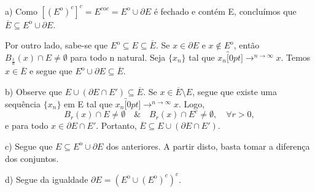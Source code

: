 \documentclass[metric_notes.tex]{subfiles}
\begin{document}
\begin{proof*}
	a) Como \([({E}^{\mathrm{o}})^{c}]^{c} = E^{c\mathrm{o}c}={E}^{\mathrm{o}}\cup \partial E\) é fechado
	e contém E, concluímos que \(\overline{E}\subseteq{{E}^{\mathrm{o}}}\cup \partial E\).

	Por outro lado, sabe-se que \({E}^{\mathrm{o}}\subseteq{E}\subseteq{\overline{E}}\). Se \(x\in \partial E\) e \(x\not\in {E}^{\mathrm{o}}\),
	então \(B_{\frac{1}{n}}(x)\cap E \neq\emptyset\) para todo n natural. Seja \(\{x_{n}\}\) tal que \(x_{n}\overbracket[0pt]{\longrightarrow}^{n\to\infty }x.\)
	Temos \(x\in \overline{E}\) e segue que \({E}^{\mathrm{o}}\cup \partial E \subseteq{\overline{E}}.\)

	b) Observe que \(E\cup(\partial E\cap E')\subseteq{\overline{E}}\). Se \(x\in\overline{E}\setminus{E}\), segue que
	existe uma sequência \(\{x_{n}\}\) em E tal que \(x_{n}\overbracket[0pt]{\longrightarrow}^{n\to \infty}x.\) Logo,
	\[
		B_{r}(x)\cap E \neq\emptyset\quad\&\quad B_{r}(x)\cap E^{c} \neq\emptyset,\quad \forall r>0,
	\]
	e para todo \(x\in \partial E\cap E'.\) Portanto, \(\overline{E}\subseteq{E\cup(\partial E\cap E')}.\)

	c) Segue que \(E\subseteq{{E}^{\mathrm{o}}\cup \partial E}\) dos anteriores. A partir disto, basta tomar
	a diferença dos conjuntos.

	d) Segue da igualdade \(\partial E = ({E}^{\mathrm{o}}\cup ({E}^{\mathrm{o}})^{c})^{c}\).
	\qedsymbol

\end{proof*}
\end{document}
